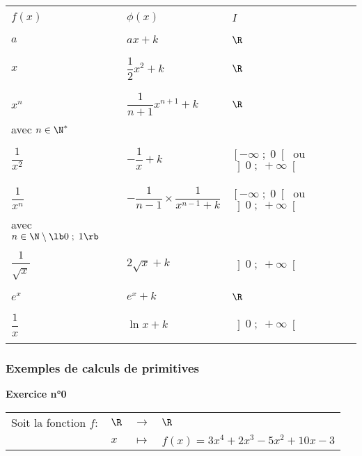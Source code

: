 \begin{tabular}{|l|l|l|}
\hline
& & \\
$f\left(x\right)$ & $\phi\left(x\right)$ & $I$ \\
& & \\
\hline
& & \\
$a$ & $ax+ k$ & $\R$ \\
& & \\
\hline
& & \\
$x$ & $\dfrac{1}{2}x^2 + k$ & $\R$ \\
& & \\
\hline 
& & \\
$x^n$ & $\dfrac{1}{n+1}x^{n+1} + k$ & $\R$ \\
avec $n \in \N^*$ & & \\ 
\hline
& & \\
$\dfrac{1}{x^2}$ & $-\dfrac{1}{x} + k$ & $\left[-\infty \; ; \; 0\right[$ ou $\left]0 \; ; \; +\infty\right[$ \\
& & \\
\hline
& & \\
$\dfrac{1}{x^n}$ & $-\dfrac{1}{n-1} \times \dfrac{1}{x^{n-1} + k}$ & $\left[-\infty \; ; \; 0\right[$ ou $\left]0 \; ; \; +\infty\right[$ \\
avec $n \in \N \setminus \lb 0 \; ; \; 1\rb$ & & \\
\hline
& & \\
$\dfrac{1}{\sqrt{x}}$ & $2\sqrt{x} + k$ & $\left] 0 \; ; \; +\infty\right[$ \\
& & \\
\hline
& & \\
$e^x$ & $e^x + k$ & $\R$ \\
& & \\
\hline
& & \\
$\dfrac{1}{x}$ & $\ln x + k$ & $\left]0 \; ; \; +\infty\right[$ \\
& & \\
\hline
\end{tabular}

\newpage

\subsubsection{Exemples de calculs de primitives}

\textbf{Exercice n°0} \\

\begin{tabular}{llll}
\hspace*{-.3cm} Soit la fonction $f:$ & $\R$ & $\longrightarrow$ & $\R$ \\
& $x$ & $\longmapsto$ & $f(x) = 3x^4 + 2x^3 - 5x^2 + 10x - 3$ \\
\end{tabular}

